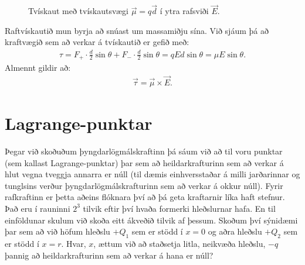 \ifdefined \wholebook \else\documentclass[oneside]{book}\usepackage{EdlBook}\graphicspath{{figures/}}
\begin{document}
\begin{figure}[H]
    \centering
{}
    \caption{Tvískaut með tvískautsvægi $\vec{\mu} = q\vec{d}$ í ytra rafsviði $\vec{E}$.}
\end{figure}
Raftvískautið mun byrja að snúast um massamiðju sína. Við sjáum þá að kraftvægið sem að verkar á tvískautið er gefið með:
\begin{align*}
    \tau = F_+ \cdot \frac{d}{2}\sin\theta + F_- \cdot \frac{d}{2}\sin\theta = qEd\sin\theta = \mu E\sin\theta.
\end{align*}
Almennt gildir að:
\begin{align*}
    \vec{\tau} = \vec{\mu} \times \vec{E}.
\end{align*}

\section{Lagrange-punktar}

Þegar við skoðuðum þyngdarlögmálskraftinn þá sáum við að til voru punktar (sem kallast Lagrange-punktar) þar sem að heildarkrafturinn sem að verkar á hlut vegna tveggja annarra er núll (til dæmis einhversstaðar á milli jarðarinnar og tunglsins verður þyngdarlögmálskrafturinn sem að verkar á okkur núll). Fyrir rafkraftinn er þetta aðeins flóknara því að þá geta kraftarnir líka haft stefnur. Það eru í rauninni $2^3$ tilvik eftir því hvaða formerki hleðslurnar hafa. En til einföldunar skulum við skoða eitt ákveðið tilvik af þessum. Skoðum því sýnidæmi þar sem að við höfum hleðslu $+Q_1$ sem er stödd í $x = 0$ og aðra hleðslu $+Q_2$ sem er stödd í $x = r$. Hvar, $x$, ættum við að staðsetja litla, neikvæða hleðslu, $-q$ þannig að heildarkrafturinn sem að verkar á hana er núll?
\end{document}
